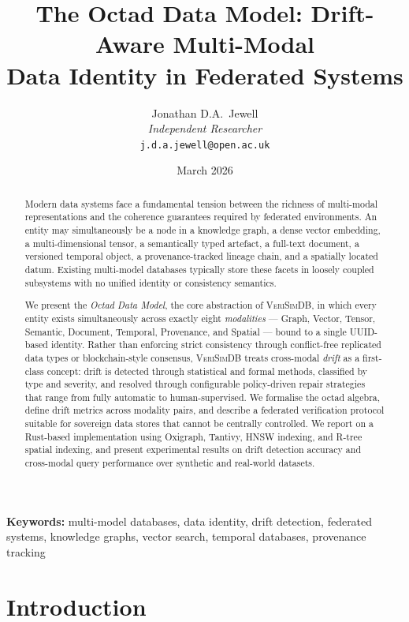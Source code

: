 \documentclass[11pt,twocolumn]{article}
\title{%
  \textbf{The Octad Data Model: Drift-Aware Multi-Modal\\
  Data Identity in Federated Systems}%
}
\author{
  Jonathan D.A.\ Jewell\\
  \textit{Independent Researcher}\\
  \texttt{j.d.a.jewell@open.ac.uk}
}
\date{March 2026}
\newcommand{\verisimdb}{\textsc{VeriSimDB}\xspace}
\begin{document}
\maketitle

\begin{abstract}
Modern data systems face a fundamental tension between the richness of
multi-modal representations and the coherence guarantees required by federated
environments.  An entity may simultaneously be a node in a knowledge graph, a
dense vector embedding, a multi-dimensional tensor, a semantically typed
artefact, a full-text document, a versioned temporal object, a provenance-tracked
lineage chain, and a spatially located datum.  Existing multi-model databases
typically store these facets in loosely coupled subsystems with no unified
identity or consistency semantics.

We present the \emph{Octad Data Model}, the core abstraction of \verisimdb, in
which every entity exists simultaneously across exactly eight \emph{modalities}
--- Graph, Vector, Tensor, Semantic, Document, Temporal, Provenance, and Spatial
--- bound to a single UUID-based identity.  Rather than enforcing strict
consistency through conflict-free replicated data types or blockchain-style
consensus, \verisimdb treats cross-modal \emph{drift} as a first-class concept:
drift is detected through statistical and formal methods, classified by type and
severity, and resolved through configurable policy-driven repair strategies that
range from fully automatic to human-supervised.  We formalise the octad algebra,
define drift metrics across modality pairs, and describe a federated
verification protocol suitable for sovereign data stores that cannot be centrally
controlled.  We report on a Rust-based implementation using Oxigraph, Tantivy,
HNSW indexing, and R-tree spatial indexing, and present experimental results on
drift detection accuracy and cross-modal query performance over synthetic and
real-world datasets.
\end{abstract}

\noindent\textbf{Keywords:}
multi-model databases, data identity, drift detection, federated systems,
knowledge graphs, vector search, temporal databases, provenance tracking

\section{Introduction}\label{sec:intro}
\end{document}
